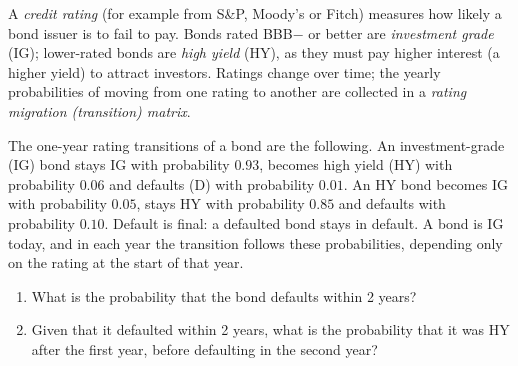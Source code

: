 
\begin{problem}
	\begin{context}
		A \emph{credit rating} (for example from S\&P, Moody's or Fitch) measures
		how likely a bond issuer is to fail to pay. Bonds rated BBB$-$ or better
		are \emph{investment grade} (IG); lower-rated bonds are \emph{high yield}
		(HY), as they must pay higher interest (a higher yield) to attract
		investors. Ratings
		change over time; the yearly probabilities of moving from one rating to
		another are collected in a \emph{rating migration (transition) matrix}.
	\end{context}
	The one-year rating transitions of a bond are the following. An
	investment-grade (IG) bond stays IG with probability $0.93$, becomes high
	yield (HY) with probability $0.06$ and defaults (D) with probability $0.01$.
	An HY bond becomes IG with probability $0.05$, stays HY with probability
	$0.85$ and defaults with probability $0.10$. Default is final: a defaulted
	bond stays in default. A bond is IG today, and in each year the transition
	follows these probabilities, depending only on the rating at the start of
	that year.
	\begin{enumerate}
		\item[(a)] What is the probability that the bond defaults within 2 years?
		\item[(b)] Given that it defaulted within 2 years, what is the probability
		      that it was HY after the first year, before defaulting in the second
		      year?
	\end{enumerate}
\end{problem}

